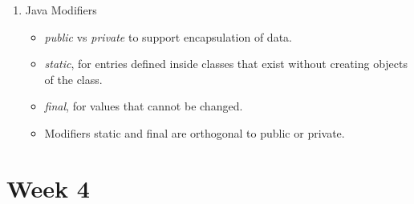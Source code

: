 \documentclass[a4paper]{article}
\begin{document}
\begin{enumerate}
\begin{itemize}
    \end{itemize}
    \item Java Modifiers
    \begin{itemize}
        \item \textit{public} vs \textit{private} to support encapsulation of data.
        \item \textit{static}, for entries defined inside classes that exist without creating objects of the class.
        \item \textit{final}, for values that cannot be changed.
        \item Modifiers static and final are orthogonal to public or private.
    \end{itemize}
\end{enumerate}
\section{Week 4}
\end{document}
